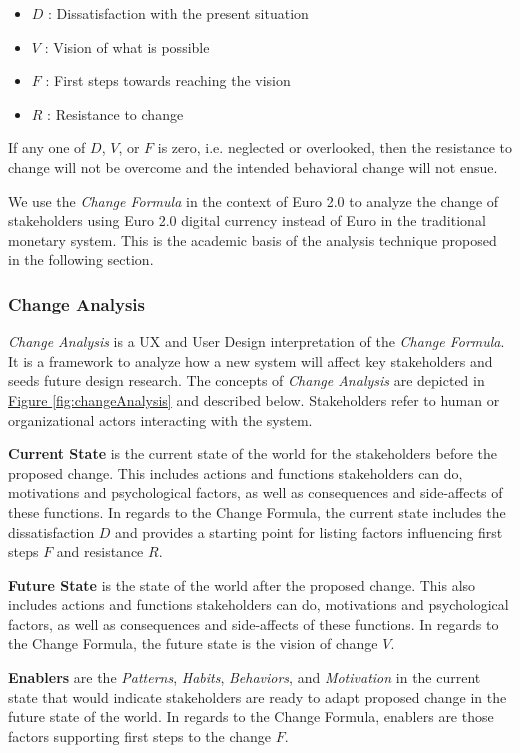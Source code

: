 \documentclass[a4paper,12pt]{article} %
\newcommand{\hyperfigureref}[1]{\hyperref[#1]{Figure \ref{#1}}}
\begin{document}
{\begin{itemize}
	\item $D$ : Dissatisfaction with the present situation
	\item $V$ : Vision of what is possible
	\item $F$ : First steps towards reaching the vision
	\item $R$ : Resistance to change
\end{itemize}

If any one of $D$, $V$, or $F$ is zero, i.e. neglected or overlooked, then the resistance to change will not be overcome and the intended behavioral change will not ensue.

We use the \textit{Change Formula} in the context of Euro 2.0 to analyze the change of stakeholders using Euro 2.0 digital currency instead of Euro in the traditional monetary system. This is the academic basis of the analysis technique proposed in the following section.

\subsubsection{Change Analysis} \label{sssec:4.2:changeAnalysis}

\textit{Change Analysis} is a UX and User Design interpretation of the \textit{Change Formula}. It is a framework to analyze how a new system will affect key stakeholders and seeds future design research. The concepts of \textit{Change Analysis} are depicted in \hyperfigureref{fig:changeAnalysis} and described below. Stakeholders refer to human or organizational actors interacting with the system.

\textbf{Current State} is the current state of the world for the stakeholders before the proposed change. This includes actions and functions stakeholders can do, motivations and psychological factors, as well as consequences and side-affects of these functions. In regards to the Change Formula, the current state includes the dissatisfaction $D$ and provides a starting point for listing factors influencing first steps $F$ and resistance $R$.

\textbf{Future State} is the state of the world after the proposed change. This also includes actions and functions stakeholders can do, motivations and psychological factors, as well as consequences and side-affects of these functions. In regards to the Change Formula, the future state is the vision of change $V$.

\textbf{Enablers} are the \textit{Patterns}, \textit{Habits}, \textit{Behaviors}, and \textit{Motivation} in the current state that would indicate stakeholders are ready to adapt proposed change in the future state of the world. In regards to the Change Formula, enablers are those factors supporting first steps to the change $F$.

}
\end{document}
